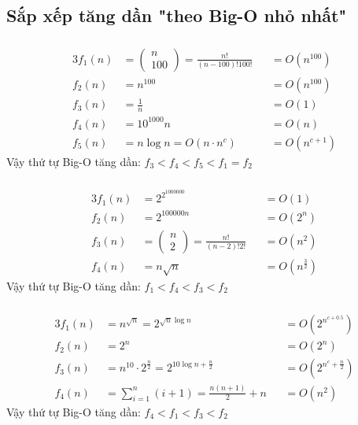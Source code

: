 \subsection{Sắp xếp tăng dần "theo Big-O nhỏ nhất"}
\subsubsection{}
\begin{alignat*}{3}
     f_1(n) &= \left(\begin{matrix}
    n \\
    100
    \end{matrix}\right) = \frac{n!}{(n-100)!100!} &&=O(n^{100}) \\
     f_2(n) &= n^{100} &&= O(n^{100}) \\
     f_3(n) &= \frac{1}{n} &&= O(1) \\
     f_4(n) &= 10^{1000}n &&=O(n) \\
     f_5(n) &= n\log n = O(n\cdot n^c) &&= O(n^{c+1})
\end{alignat*}
Vậy thứ tự Big-O tăng dần: $f_3 < f_4 < f_5 < f_1 = f_2$
\subsubsection{}
\begin{alignat*}{3}
     f_1(n) &= 2^{2^{1000000}} &&=O(1) \\
     f_2(n) &= 2^{100000n} &&= O(2^n) \\
     f_3(n) &= \left(\begin{matrix}
        n \\
        2
    \end{matrix}\right) = \frac{n!}{(n-2)!2!} &&= O(n^2) \\
     f_4(n) &= n\sqrt{n} &&=O(n^{\frac{3}{2}})
\end{alignat*}
Vậy thứ tự Big-O tăng dần: $f_1 < f_4 < f_3 < f_2$
\subsubsection{}
\begin{alignat*}{3}
     f_1(n) &= n^{\sqrt{n}}=2^{\sqrt{n}\log n} &&=O(2^{n^{c+0.5}}) \\
     f_2(n) &= 2^n &&= O(2^n) \\
     f_3(n) &= n^{10}\cdot 2^{\frac{n}{2}} = 2^{10\log n + \frac{n}{2}} &&= O(2^{n^c+\frac{n}{2}}) \\
     f_4(n) &= \sum_{i=1}^n (i+1) = \frac{n(n+1)}{2} + n &&=O(n^2)
\end{alignat*}
Vậy thứ tự Big-O tăng dần: $f_4 < f_1 < f_3 < f_2$
